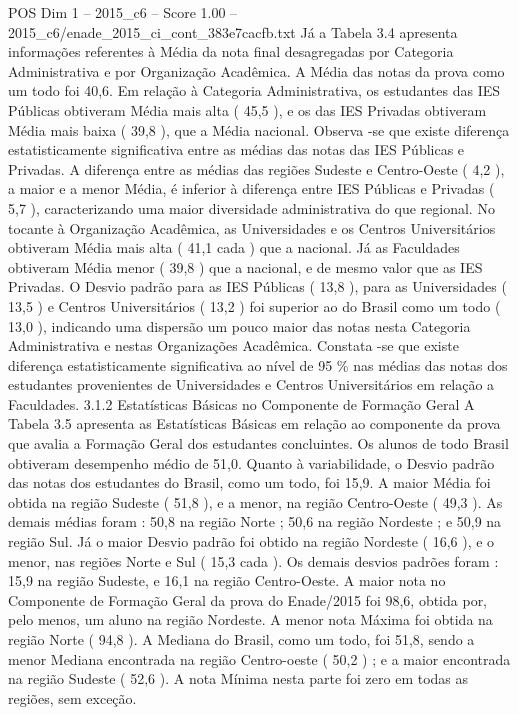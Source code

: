 \begin{textsample}{POS Dim 1 – 2015\_c6 – Score 1.00 – 2015\_c6/enade\_2015\_ci\_cont\_383e7cacfb.txt}
Já a Tabela 3.4 apresenta informações referentes à Média da nota final desagregadas por Categoria Administrativa e por Organização Acadêmica.
A Média das notas da prova como um todo foi 40,6.
Em relação à Categoria Administrativa, os estudantes das IES Públicas obtiveram Média mais alta ( 45,5 ), e os das IES Privadas obtiveram Média mais baixa ( 39,8 ), que a Média nacional.
Observa -se que existe diferença estatisticamente significativa entre as médias das notas das IES Públicas e Privadas.
A diferença entre as médias das regiões Sudeste e Centro-Oeste ( 4,2 ), a maior e a menor Média, é inferior à diferença entre IES Públicas e Privadas ( 5,7 ), caracterizando uma maior diversidade administrativa do que regional.
No tocante à Organização Acadêmica, as Universidades e os Centros Universitários obtiveram Média mais alta ( 41,1 cada ) que a nacional.
Já as Faculdades obtiveram Média menor ( 39,8 ) que a nacional, e de mesmo valor que as IES Privadas.
O Desvio padrão para as IES Públicas ( 13,8 ), para as Universidades ( 13,5 ) e Centros Universitários ( 13,2 ) foi superior ao do Brasil como um todo ( 13,0 ), indicando uma dispersão um pouco maior das notas nesta Categoria Administrativa e nestas Organizações Acadêmica.
Constata -se que existe diferença estatisticamente significativa ao nível de 95 \% nas médias das notas dos estudantes provenientes de Universidades e Centros Universitários em relação a Faculdades. 3.1.2 Estatísticas Básicas no Componente de Formação Geral A Tabela 3.5 apresenta as Estatísticas Básicas em relação ao componente da prova que avalia a Formação Geral dos estudantes concluintes.
Os alunos de todo Brasil obtiveram desempenho médio de 51,0.
Quanto à variabilidade, o Desvio padrão das notas dos estudantes do Brasil, como um todo, foi 15,9.
A maior Média foi obtida na região Sudeste ( 51,8 ), e a menor, na região Centro-Oeste ( 49,3 ).
As demais médias foram : 50,8 na região Norte ; 50,6 na região Nordeste ; e 50,9 na região Sul.
Já o maior Desvio padrão foi obtido na região Nordeste ( 16,6 ), e o menor, nas regiões Norte e Sul ( 15,3 cada ).
Os demais desvios padrões foram : 15,9 na região Sudeste, e 16,1 na região Centro-Oeste.
A maior nota no Componente de Formação Geral da prova do Enade/2015 foi 98,6, obtida por, pelo menos, um aluno na região Nordeste.
A menor nota Máxima foi obtida na região Norte ( 94,8 ).
A Mediana do Brasil, como um todo, foi 51,8, sendo a menor Mediana encontrada na região Centro-oeste ( 50,2 ) ; e a maior encontrada na região Sudeste ( 52,6 ).
A nota Mínima nesta parte foi zero em todas as regiões, sem exceção.

\end{textsample}
